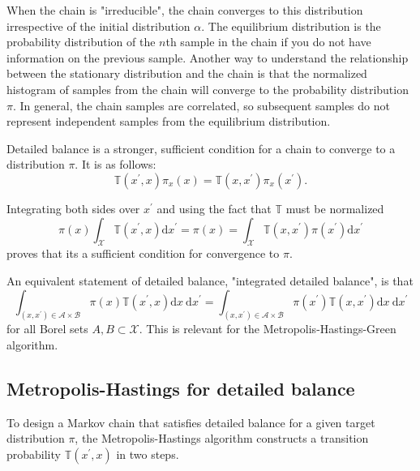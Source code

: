 \documentclass[11pt]{article}
\begin{document}
When the chain is "irreducible", the chain converges to this distribution irrespective of the initial distribution $\alpha$. The equilibrium distribution is the probability distribution of the $n$th sample in the chain if you do not have information on the previous sample. Another way to understand the relationship between the stationary distribution and the chain is that the normalized histogram of samples from the chain will converge to the probability distribution $\pi$. In general, the chain samples are correlated, so subsequent samples do not represent independent samples from the equilibrium distribution.

Detailed balance is a stronger, sufficient condition for a chain to converge to a distribution $\pi$. It is as follows:
\begin{equation}
\mathbb{T}\left(x^{\prime}, x\right) \pi_{x}(x)=\mathbb{T}\left(x, x^{\prime}\right) \pi_{x}\left(x^{\prime}\right).
\end{equation}

Integrating both sides over $x^{\prime}$ and using the fact that $\mathbb{T}$ must be normalized
\begin{equation}
\pi(x) \int_{\mathcal{X}} \mathbb{T}\left(x^{\prime}, x\right) \mathrm{d} x^{\prime}=\pi(x)=\int_{\mathcal{X}} \mathbb{T}\left(x, x^{\prime}\right) \pi\left(x^{\prime}\right) \mathrm{d} x^{\prime}
\end{equation}
proves that its a sufficient condition for convergence to $\pi$.

An equivalent statement of detailed balance, "integrated detailed balance", is that
\begin{equation}
\int_{\left(x, x^{\prime}\right) \in \mathcal{A} \times \mathcal{B}} \pi(x) \mathbb{T}\left(x^{\prime}, x\right) \mathrm{d} x \mathrm{~d} x^{\prime}=\int_{\left(x, x^{\prime}\right) \in \mathcal{A} \times \mathcal{B}} \pi\left(x^{\prime}\right) \mathbb{T}\left(x, x^{\prime}\right) \mathrm{d} x \mathrm{~d} x^{\prime}
\end{equation}
for all Borel sets $A, B \subset \mathcal{X}$. This is relevant for the Metropolis-Hastings-Green algorithm.

\subsection{Metropolis-Hastings for detailed balance}

To design a Markov chain that satisfies detailed balance for a given target distribution $\pi$, the Metropolis-Hastings algorithm constructs a transition probability $\mathbb{T}\left(x^{\prime}, x\right)$ in two steps.
\end{document}
